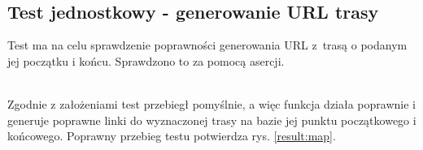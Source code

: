\noindent
\begin{minipage}{\linewidth}
    \label{test:signup}
    \centering
    \\[1em]
\end{minipage}
\\




\subsection*{Test jednostkowy - generowanie URL trasy}
Test ma na celu sprawdzenie poprawności generowania URL z~trasą o podanym jej początku i końcu. Sprawdzono to za pomocą asercji.\\
\noindent
\begin{minipage}{\linewidth}
    \label{test:map}
    \centering
\end{minipage}
\\
Zgodnie z założeniami test przebiegł pomyślnie, a więc funkcja działa poprawnie i generuje poprawne linki do wyznaczonej trasy na bazie jej punktu początkowego i końcowego. Poprawny przebieg testu potwierdza rys. \ref{result:map}. \\

